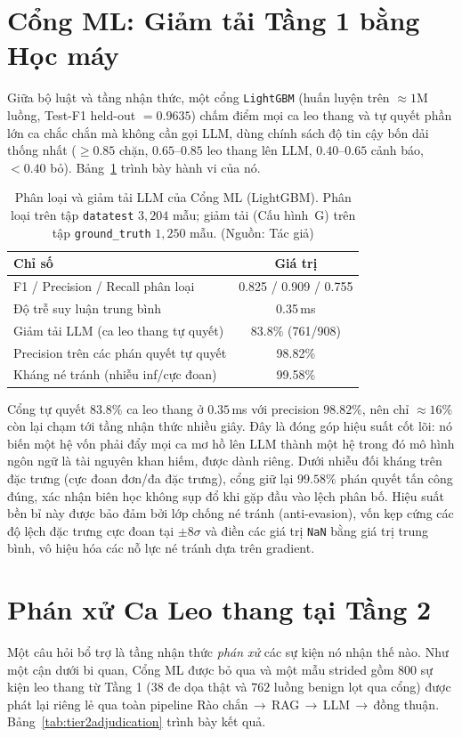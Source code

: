 \section{Cổng ML: Giảm tải Tầng 1 bằng Học máy}
\label{sec:mlgate}
Giữa bộ luật và tầng nhận thức, một cổng \texttt{LightGBM} (huấn luyện trên $\approx\!1$M luồng, Test-F1 held-out $=0.9635$) chấm điểm mọi ca leo thang và tự quyết phần lớn ca chắc chắn mà không cần gọi LLM, dùng chính sách độ tin cậy bốn dải thống nhất ($\ge\!0.85$ chặn, $0.65$--$0.85$ leo thang lên LLM, $0.40$--$0.65$ cảnh báo, $<\!0.40$ bỏ). Bảng~\ref{tab:mlgate} trình bày hành vi của nó.

\begin{table}[!htbp]
    \centering
    \caption{Phân loại và giảm tải LLM của Cổng ML (LightGBM). Phân loại trên tập \texttt{datatest} $3{,}204$ mẫu; giảm tải (Cấu hình~G) trên tập \texttt{ground\_truth} $1{,}250$ mẫu. (Nguồn: Tác giả)}
    \label{tab:mlgate}
    \begin{tabular}{|l|c|}
        \hline
        \textbf{Chỉ số} & \textbf{Giá trị} \\ \hline
        F1 / Precision / Recall phân loại & 0.825 / 0.909 / 0.755 \\ \hline
        Độ trễ suy luận trung bình & 0.35\,ms \\ \hline
        Giảm tải LLM (ca leo thang tự quyết) & 83.8\% (761/908) \\ \hline
        Precision trên các phán quyết tự quyết & 98.82\% \\ \hline
        Kháng né tránh (nhiễu inf/cực đoan) & 99.58\% \\ \hline
    \end{tabular}
\end{table}

Cổng tự quyết $83.8\%$ ca leo thang ở $0.35$\,ms với precision $98.82\%$, nên chỉ $\approx\!16\%$ còn lại chạm tới tầng nhận thức nhiều giây. Đây là đóng góp hiệu suất cốt lõi: nó biến một hệ vốn phải đẩy mọi ca mơ hồ lên LLM thành một hệ trong đó mô hình ngôn ngữ là tài nguyên khan hiếm, được dành riêng. Dưới nhiễu đối kháng trên đặc trưng (cực đoan đơn/đa đặc trưng), cổng giữ lại $99.58\%$ phán quyết tấn công đúng, xác nhận biên học không sụp đổ khi gặp đầu vào lệch phân bố. Hiệu suất bền bỉ này được bảo đảm bởi lớp chống né tránh (anti-evasion), vốn kẹp cứng các độ lệch đặc trưng cực đoan tại $\pm8\sigma$ và điền các giá trị \texttt{NaN} bằng giá trị trung bình, vô hiệu hóa các nỗ lực né tránh dựa trên gradient.

\section{Phán xử Ca Leo thang tại Tầng 2}
Một câu hỏi bổ trợ là tầng nhận thức \emph{phán xử} các sự kiện nó nhận thế nào. Như một cận dưới bi quan, Cổng ML được bỏ qua và một mẫu strided gồm $800$ sự kiện leo thang từ Tầng 1 ($38$ đe dọa thật và $762$ luồng benign lọt qua cổng) được phát lại riêng lẻ qua toàn pipeline Rào chắn\,$\rightarrow$\,RAG\,$\rightarrow$\,LLM\,$\rightarrow$\,đồng thuận. Bảng~\ref{tab:tier2adjudication} trình bày kết quả.

